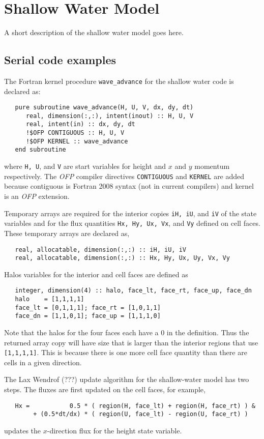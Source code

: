 \section{Shallow Water Model}

A short description of the shallow water model goes here.

\subsection{Serial code examples}

The Fortran kernel procedure {\tt wave_advance} for the shallow water code
is declared as:
\begin{verbatim}
   pure subroutine wave_advance(H, U, V, dx, dy, dt)
      real, dimension(:,:), intent(inout) :: H, U, V
      real, intent(in) :: dx, dy, dt
      !$OFP CONTIGUOUS :: H, U, V
      !$OFP KERNEL :: wave_advance
   end subroutine
\end{verbatim}
where {\tt H, U}, and {\tt V} are start variables for height and
$x$ and $y$ momentum respectively.  The \emph{OFP} compiler directives
{\tt CONTIGUOUS} and {\tt KERNEL} are added because contiguous is Fortran
2008 syntax (not in current compilers) and kernel is an \emph{OFP} extension.

Temporary arrays are required for the interior copies {\tt iH, iU}, and
{\tt iV} of the state variables and for the flux quantities {\tt Hx, Hy, Ux,
Vx}, and {\tt Vy} defined on cell faces.  These temporary arrays are declared as,
\begin{verbatim}
   real, allocatable, dimension(:,:) :: iH, iU, iV
   real, allocatable, dimension(:,:) :: Hx, Hy, Ux, Uy, Vx, Vy
\end{verbatim}

Halos variables for the interior and cell faces are defined as
\begin{verbatim}
   integer, dimension(4) :: halo, face_lt, face_rt, face_up, face_dn
   halo    = [1,1,1,1]
   face_lt = [0,1,1,1]; face_rt = [1,0,1,1]
   face_dn = [1,1,0,1]; face_up = [1,1,1,0]
\end{verbatim}
Note that the halos for the four faces each have a 0 in the definition. Thus the returned
array copy will have size that is larger than the interior regions that use {\tt [1,1,1,1]}.
This is because there is one more cell face quantity than there are cells in a given direction.

The Lax Wendrof (???) update algorithm for the shallow-water model has two steps.
The fluxes are first updated on the cell faces, for example,
\begin{verbatim}
   Hx =           0.5 * ( region(H, face_lt) + region(H, face_rt) ) &
        + (0.5*dt/dx) * ( region(U, face_lt) - region(U, face_rt) )
\end{verbatim}
updates the $x$-direction flux for the height state variable.

